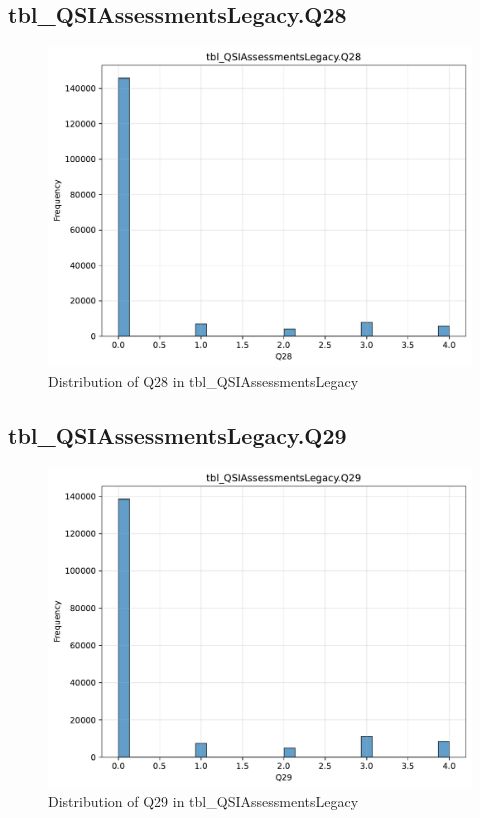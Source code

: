 \subsection{tbl\_QSIAssessmentsLegacy.Q28}

\begin{figure}[htbp]
\centering
\includegraphics[width=\textwidth]{figures/dbo_tbl_QSIAssessmentsLegacy_Q28.pdf}
\caption{Distribution of Q28 in tbl\_QSIAssessmentsLegacy}
\end{figure}\newpage

\subsection{tbl\_QSIAssessmentsLegacy.Q29}

\begin{figure}[htbp]
\centering
\includegraphics[width=\textwidth]{figures/dbo_tbl_QSIAssessmentsLegacy_Q29.pdf}
\caption{Distribution of Q29 in tbl\_QSIAssessmentsLegacy}
\end{figure}\newpage

